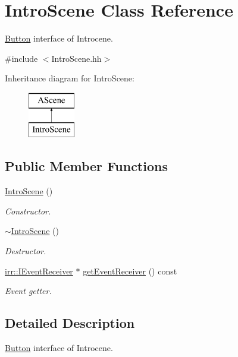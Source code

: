 \hypertarget{classIntroScene}{}\section{Intro\+Scene Class Reference}
\label{classIntroScene}


\hyperlink{classButton}{Button} interface of Introcene.  




{\ttfamily \#include $<$Intro\+Scene.\+hh$>$}

Inheritance diagram for Intro\+Scene\+:\begin{figure}[H]
\begin{center}
\leavevmode
\includegraphics[height=2.000000cm]{classIntroScene}
\end{center}
\end{figure}
\subsection*{Public Member Functions}
\begin{DoxyCompactItemize}
\item 
\hyperlink{classIntroScene_a3691b51409f65b40f0c84008e49ef32b}{Intro\+Scene} ()
\begin{DoxyCompactList}\small\item\em Constructor. \end{DoxyCompactList}\item 
\hyperlink{classIntroScene_a7cdb50b55c0f5cf66b7bd151e4abe2b1}{$\sim$\+Intro\+Scene} ()
\begin{DoxyCompactList}\small\item\em Destructor. \end{DoxyCompactList}\item 
\hyperlink{classirr_1_1IEventReceiver}{irr\+::\+I\+Event\+Receiver} $\ast$ \hyperlink{classIntroScene_acabf925dab7b2a346edd398445cd5800}{get\+Event\+Receiver} () const
\begin{DoxyCompactList}\small\item\em Event getter. \end{DoxyCompactList}\end{DoxyCompactItemize}


\subsection{Detailed Description}
\hyperlink{classButton}{Button} interface of Introcene. 

